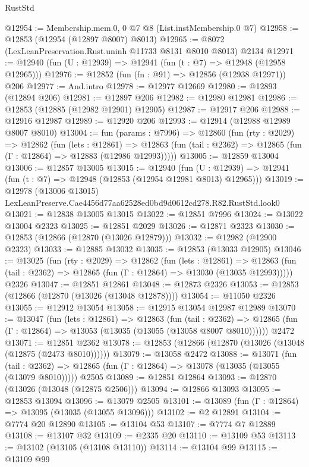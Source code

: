 \begin{lexlean}{RustStd}
\begin{coremodule}
@12954 := Membership.mem.{0, 0} @7 @8 (List.instMembership.{0} @7)
@12958 := @12853 (@12954 (@12897 @8007) @8013)
@12965 := @8072 (LexLeanPreservation.Rust.uninh @11733 @8131 @8010 @8013) @2134
@12971 := @12940 (fun (U : @12939) => @12941 (fun (t : @7) => @12948 (@12958 @12965)))
@12976 := @12852 (fun (fn : @91) => @12856 (@12938 @12971)) @206
@12977 := And.intro
@12978 := @12977 @12669
@12980 := @12893 (@12894 @206)
@12981 := @12897 @206
@12982 := @12980 @12981
@12986 := @12853 (@12885 (@12982 @12901) @12905)
@12987 := @12917 @206
@12988 := @12916 @12987
@12989 := @12920 @206
@12993 := @12914 (@12988 @12989 @8007 @8010)
@13004 := fun (params : @7996) =>
  @12860
    (fun (rty : @2029) =>
    @12862
      (fun (lets : @12861) =>
      @12863 (fun (tail : @2362) => @12865 (fun (Γ : @12864) => @12883 (@12986 @12993)))))
@13005 := @12859 @13004
@13006 := @12857 @13005
@13015 := @12940
    (fun (U : @12939) => @12941 (fun (t : @7) => @12948 (@12853 (@12954 @12981 @8013) @12965)))
@13019 := @12978 (@13006 @13015) LexLeanPreserve.Cae4456d77aa62528ed0bd9d0612cd278.R82.RustStd.look0
@13021 := @12838 @13005 @13015
@13022 := @12851 @7996
@13024 := @13022 @13004 @2323
@13025 := @12851 @2029
@13026 := @12871 @2323
@13030 := @12853 (@12866 (@12870 (@13026 @12879)))
@13032 := @12982 (@12900 @2323)
@13033 := @12885 @13032
@13035 := @12853 (@13033 @12905)
@13046 := @13025
    (fun (rty : @2029) =>
    @12862
      (fun (lets : @12861) =>
      @12863 (fun (tail : @2362) => @12865 (fun (Γ : @12864) => @13030 (@13035 @12993)))))
    @2326
@13047 := @12851 @12861
@13048 := @12873 @2326
@13053 := @12853 (@12866 (@12870 (@13026 (@13048 @12878))))
@13054 := @11050 @2326
@13055 := @12912 @13054
@13058 := @12915 @13054 @12987 @12989
@13070 := @13047
    (fun (lets : @12861) =>
    @12863
      (fun (tail : @2362) =>
      @12865 (fun (Γ : @12864) => @13053 (@13035 (@13055 (@13058 @8007 @8010))))))
    @2472
@13071 := @12851 @2362
@13078 := @12853 (@12866 (@12870 (@13026 (@13048 (@12875 (@2473 @8010))))))
@13079 := @13058 @2472
@13088 := @13071
    (fun (tail : @2362) => @12865 (fun (Γ : @12864) => @13078 (@13035 (@13055 (@13079 @8010)))))
    @2505
@13089 := @12851 @12864
@13093 := @12870 (@13026 (@13048 (@12875 @2506)))
@13094 := @12866 @13093
@13095 := @12853 @13094
@13096 := @13079 @2505
@13101 := @13089 (fun (Γ : @12864) => @13095 (@13035 (@13055 @13096)))
@13102 := @2 @12891
@13104 := @7774 @20 @12890
@13105 := @13104 @53
@13107 := @7774 @7 @12889
@13108 := @13107 @32
@13109 := @2335 @20
@13110 := @13109 @53
@13113 := @13102 (@13105 (@13108 @13110))
@13114 := @13104 @99
@13115 := @13109 @99

\end{coremodule}
\end{lexlean}
